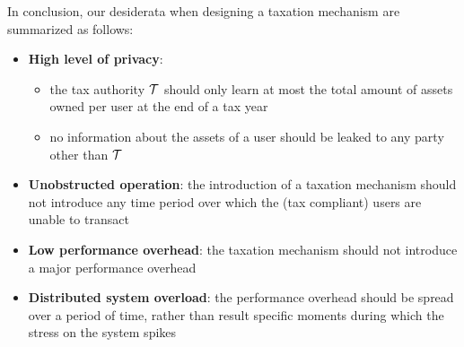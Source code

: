 In conclusion, our desiderata when designing a taxation mechanism are
summarized as follows:
\begin{itemize}
    \item \textbf{High level of privacy}:
        \begin{itemize}
            \item the tax authority $\mathcal{T}$ should only learn at most the
                total amount of assets owned per user at the end of a tax year
            \item no information about the assets of a user should be leaked to
                any party other than $\mathcal{T}$
        \end{itemize}
    \item \textbf{Unobstructed operation}: the introduction of a taxation
        mechanism should not introduce any time period over which the (tax
        compliant) users are unable to transact
    \item \textbf{Low performance overhead}: the taxation mechanism should not
        introduce a major performance overhead
    \item \textbf{Distributed system overload}: the performance overhead should
        be spread over a period of time, rather than result specific moments
        during which the stress on the system spikes
\end{itemize}
